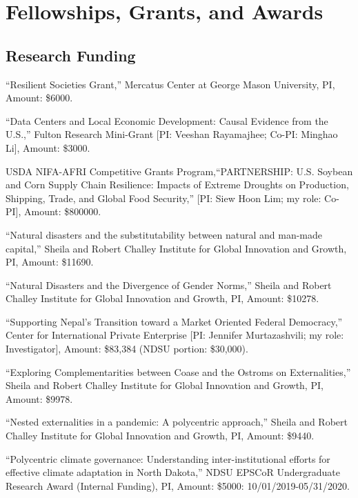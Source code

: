 \documentclass[12pt,letterpaper]{report}
\begin{document}
    \section*{Fellowships, Grants, and Awards}

    \subsection*{Research Funding}

   \begin{tablist}

    \item [2026] \tab ``Resilient Societies Grant,'' Mercatus Center at George Mason University, PI, Amount: \$6000.
    \item [2026] \tab ``Data Centers and Local Economic Development: Causal Evidence from the U.S.,'' Fulton Research Mini-Grant [PI: Veeshan Rayamajhee; Co-PI: Minghao Li], Amount: \$3000.

    \item [2024-28] \tab USDA NIFA-AFRI Competitive Grants Program,``PARTNERSHIP: U.S. Soybean and Corn Supply Chain Resilience: Impacts of Extreme Droughts on Production, Shipping, Trade, and Global Food Security,'' [PI: Siew Hoon Lim; my role: Co-PI], Amount: \$800000.

    \item [2024] \tab ``Natural disasters and the substitutability between natural and man-made capital,'' Sheila and Robert Challey Institute for Global Innovation and Growth, PI, Amount: \$11690.

    \item [2023] \tab ``Natural Disasters and the Divergence of Gender Norms,'' Sheila and Robert Challey Institute for Global Innovation and Growth, PI, Amount: \$10278.

    \item [2021-22] \tab ``Supporting Nepal's Transition toward a Market Oriented Federal Democracy,'' Center for International Private Enterprise [PI: Jennifer Murtazashvili; my role: Investigator], Amount: \$83,384 (NDSU portion: \$30,000).

    \item [2022] \tab ``Exploring Complementarities between Coase and the Ostroms on Externalities,'' Sheila and Robert Challey Institute for Global Innovation and Growth, PI, Amount: \$9978.

   		\item [2021] \tab ``Nested externalities in a pandemic: A polycentric approach,'' Sheila and Robert Challey Institute for Global Innovation and Growth, PI, Amount: \$9440.
   		\item [2019] \tab ``Polycentric climate governance: Understanding inter-institutional efforts for effective climate adaptation in North Dakota,'' NDSU EPSCoR Undergraduate Research Award (Internal Funding), PI, Amount: \$5000: 10/01/2019-05/31/2020.

   \end{tablist}
\end{document}
